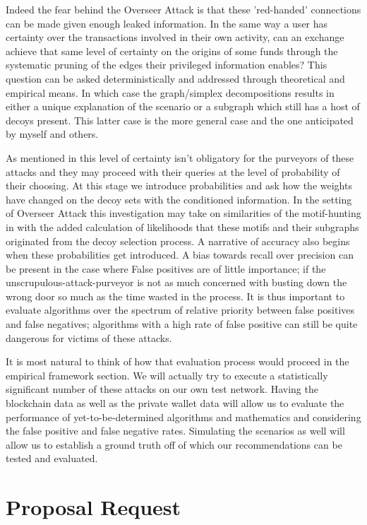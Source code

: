 \documentclass[prc, 12pt]{revtex4-1}
\begin{document}
Indeed the fear behind the Overseer Attack is that these 'red-handed' connections can be made given enough leaked information.  In the same way a user has certainty over the transactions involved in their own activity, can an exchange achieve that same level of certainty on the origins of some funds through the systematic pruning of the edges their privileged information enables?  This question can be asked deterministically and addressed through theoretical and empirical means.  In which case the graph/simplex decompositions results in either a unique explanation of the scenario or a subgraph which still has a host of decoys present.  This latter case is the more general case and the one anticipated by myself and others.  

As mentioned in \cite{MiersZcash} this level of certainty isn't obligatory for the purveyors of these attacks and they may proceed with their queries at the level of probability of their choosing.  At this stage we introduce probabilities and ask how the weights have changed on the decoy sets with the conditioned information.  In the setting of Overseer Attack this investigation may take on similarities of the motif-hunting in \cite{ranshous2017exchange} with the added calculation of likelihoods that these motifs and their subgraphs originated from the decoy selection process.  A narrative of accuracy also begins when these probabilities get introduced.  A bias towards recall over precision can be present in the case where False positives are of little importance; if the unscrupulous-attack-purveyor is not as much concerned with busting down the wrong door so much as the time wasted in the process.  It is thus important to evaluate algorithms over the spectrum of relative priority between false positives and false negatives; algorithms with a high rate of false positive can still be quite dangerous for victims of these attacks.

It is most natural to think of how that evaluation process would proceed in the empirical framework section.  We will actually try to execute a statistically significant number of these attacks on our own test network.  Having the blockchain data as well as the private wallet data will allow us to evaluate the performance of yet-to-be-determined algorithms and mathematics and considering the false positive and false negative rates.  Simulating the scenarios as well will allow us to establish a ground truth off of which our recommendations can be tested and evaluated.  

\section{Proposal Request}
\end{document}
